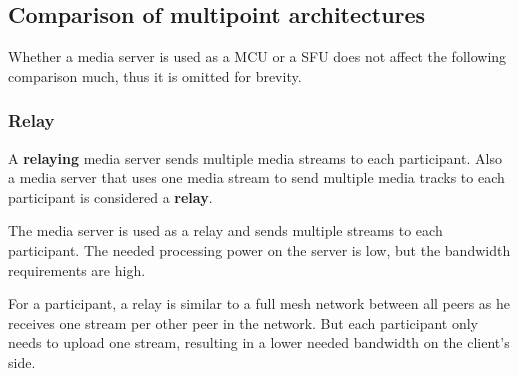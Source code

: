 \documentclass[../../../thesis.tex]{subfiles}
\begin{document}
\clearpage

\subsection{Comparison of multipoint architectures}
Whether a media server is used as a MCU or a SFU does not affect the following comparison much, thus it is omitted for brevity.
\label{subsec:multipoint-architectures}

\subsubsection{Relay}
A \textbf{relaying} media server sends multiple media streams to each participant. Also a media server that uses one media stream to send multiple media tracks to each participant is considered a \textbf{relay}\footnotemark.\\

\noindent
The media server is used as a relay and sends multiple streams to each participant. The needed processing power on the server is low, but the bandwidth requirements are high.\par
For a participant, a relay is similar to a full mesh network between all peers as he receives one stream per other peer in the network. But each participant only needs to upload one stream, resulting in a lower needed bandwidth on the client's side.\\
\clearpage
\end{document}
